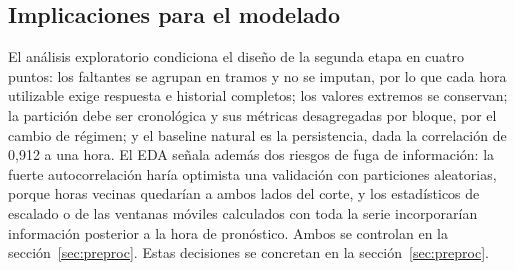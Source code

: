 \subsection{Implicaciones para el modelado}
\label{sec:implicaciones}

El análisis exploratorio condiciona el diseño de la segunda etapa en cuatro puntos: los faltantes se agrupan en tramos y no se imputan, por lo que cada hora utilizable exige respuesta e historial completos; los valores extremos se conservan; la partición debe ser cronológica y sus métricas desagregadas por bloque, por el cambio de régimen; y el baseline natural es la persistencia, dada la correlación de 0,912 a una hora. El EDA señala además dos riesgos de fuga de información: la fuerte autocorrelación haría optimista una validación con particiones aleatorias, porque horas vecinas quedarían a ambos lados del corte, y los estadísticos de escalado o de las ventanas móviles calculados con toda la serie incorporarían información posterior a la hora de pronóstico. Ambos se controlan en la sección~\ref{sec:preproc}. Estas decisiones se concretan en la sección~\ref{sec:preproc}.

